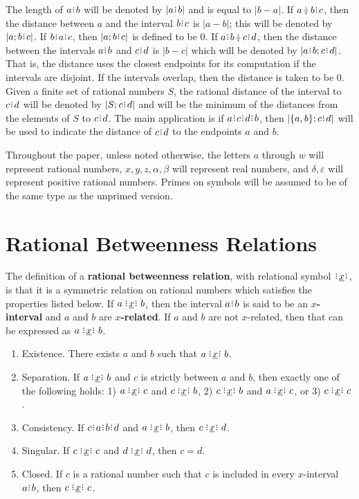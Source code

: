 \documentclass[12pt]{article}
\begin{document}
The length of $a\rint b$ will be denoted by $|a\rint b|$ and is equal to $|b-a|$. If $a \betneq b \rint c$, then the distance between $a$ and the interval $b \rint c$ is $|a-b|$; this will be denoted by $|a; b\rint c|$. If $b\rint a\rint c$, then $|a; b\rint c|$ is defined to be $0$. If $a \rint b \betneq c \rint d$, then the distance between the intervals $a \rint b$  and $c \rint d$ is $|b-c|$ which will be denoted by $|a\rint b; c\rint d|$.  That is, the distance uses the closest endpoints for its computation if the intervals are disjoint. If the intervals overlap, then the distance is taken to be $0$. Given a finite set of rational numbers $S$, the rational distance of the interval to $c \rint d$ will be denoted by $|S; c \rint d|$ and will be the minimum of the distances from the elements of $S$ to $c \rint d$. The main application is if $a \rint c \rint d \rint b$, then $|\{a, b\}; c\rint d|$ will be used to indicate the distance of $c \rint d$ to the endpoints $a$ and $b$.

Throughout the paper, unless noted otherwise, the letters $a$ through $w$ will represent rational numbers, $x, y, z, \alpha, \beta$ will represent real numbers, and $\delta, \varepsilon$ will represent positive rational numbers. Primes on symbols will be assumed to be of the same type as the unprimed version. 

\section{Rational Betweenness Relations}


The definition of a \textbf{rational betweenness relation}, with relational symbol $\xrel$, is that it is a symmetric relation on rational numbers which satisfies the properties listed below. If $a \xrel b$, then the interval $a\rint b$ is said to be an \textbf{$x$-interval} and $a$ and $b$ are \textbf{$x$-related}. If $a$ and $b$ are not $x$-related, then that can be expressed as \sout{$a \xrel b$}.

\begin{enumerate}
    \item Existence. There exists $a$ and $b$ such that $a\xrel b$.
    \item Separation. If $a \xrel b$ and $c$ is strictly between $a$ and $b$, then exactly one of the following holds:  1) $a \xrel c$ and \sout{$c \xrel b$}, 2) $c \xrel b$ and \sout{$a \xrel c$}, or 3) $c \xrel c$. 
    \item Consistency. If $c \rint  a \rint  b \rint  d$ and $a \xrel b$, then $c \xrel d$. 
    \item Singular. If $c \xrel c$ and $d \xrel d$, then $c=d$. 
    \item Closed. If $c$ is a rational number such that $c$ is included in every $x$-interval $a\rint b$, then  $c \xrel c$. 
\end{enumerate}
\end{document}
